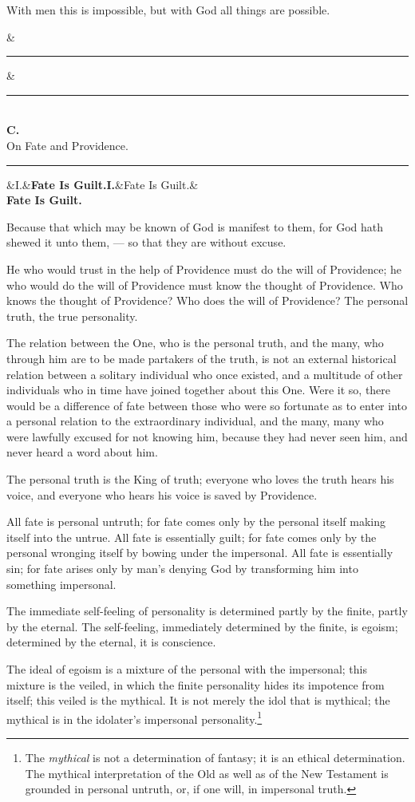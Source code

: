 \documentclass[12pt,a4paper,openany]{book}
\newcommand{\opage}[1]{\marginnote{\footnotesize\textit{[#1]}}}
\newcommand{\afdeling}[3][]{\begin{center}\ifx&#1&\else#1\\[0.6em]\fi\textbf{#2}\\[0.3em]{\Large #3}\\[0.3em]\rule{3em}{0.4pt}\end{center}\addcontentsline{toc}{section}{#2 #3}}
\newcommand{\stykke}[2]{\begin{center}\ifx&#1&\textbf{#2}\else\textbf{#1}\ifx&#2&\else\\[0.2em]\textbf{#2}\fi\fi\end{center}}
\begin{document}
With men this is impossible, but
with God all things are possible.

\afdeling[\rule{10em}{0.4pt}]{C.}{On Fate and Providence.}
\stykke{I.}{Fate Is Guilt.}

Because that which may be known of God is manifest to them, for God hath shewed it unto them, --- so that
they are without excuse.

He who would trust in the help of Providence
must do the will of Providence; he who
would do the will of Providence must know the thought of Providence. Who knows the thought of Providence?
Who does the will of Providence? The personal
truth, the true personality.

\setcounter{footnote}{0}%
\opage{49}The relation between the One, who is the personal
truth, and the many, who through him
are to be made partakers of the truth, is not an
external historical relation between a solitary
individual who once existed, and
a multitude of other individuals who in time have
joined together about this One. Were it so,
there would be a difference of fate
between those who were so fortunate as to
enter into a personal relation to the extraordinary
individual, and the many, many who were
lawfully excused for not knowing him, because
they had never seen him, and never heard a
word about him.

The personal truth is the King of
truth; everyone who loves the truth hears
his voice, and everyone who hears his voice %
is saved by Providence.

All fate is personal untruth; for fate
comes only by the personal itself
making itself into the untrue. All fate is essentially
guilt; for fate comes only by the personal wronging itself by
bowing under the impersonal. All fate is
essentially sin; for fate arises only
\setcounter{footnote}{0}%
\opage{50}by man's denying God by
transforming him into something impersonal.

The immediate self-feeling of personality
is determined partly by the finite, partly
by the eternal. The self-feeling, immediately
determined by the finite, is egoism; determined
by the eternal, it is conscience.

The ideal of egoism is a mixture of the
personal with the impersonal; this mixture
is the veiled, in which the finite
personality hides its impotence from itself;
this veiled is the mythical. It is
not merely the idol that is mythical; the mythical
is in the idolater's impersonal personality.\footnote{The \textit{mythical} is not a determination of fantasy; it is an ethical determination. The mythical interpretation of the Old as well as of the New Testament is grounded in personal untruth, or, if one will, in impersonal truth.}
\end{document}
